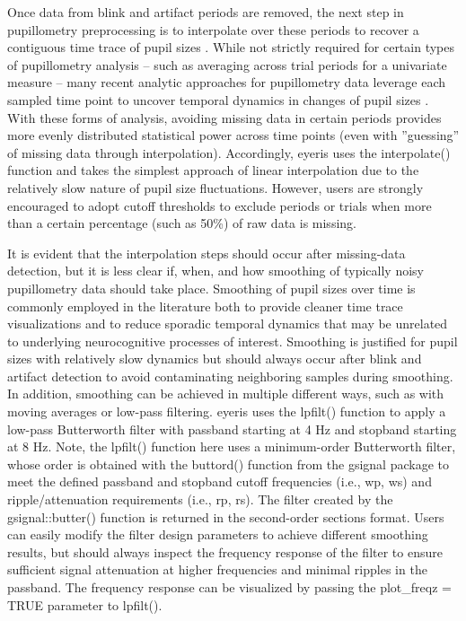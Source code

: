 Once data from blink and artifact periods are removed, the next step in pupillometry preprocessing is to interpolate over these periods to recover a contiguous time trace of pupil sizes \parencite{mathot2013simple}. While not strictly required for certain types of pupillometry analysis – such as averaging across trial periods for a univariate measure – many recent analytic approaches for pupillometry data leverage each sampled time point to uncover temporal dynamics in changes of pupil sizes \parencite{clewett2020pupil,johansson2018pupil,steinhauer2004sympathetic,urai2017pupil,vanslooten2018how,verney2004pupillary,widmann2018emotion}. With these forms of analysis, avoiding missing data in certain periods provides more evenly distributed statistical power across time points (even with ”guessing” of missing data through interpolation). Accordingly, eyeris uses the interpolate() function and takes the simplest approach of linear interpolation due to the relatively slow nature of pupil size fluctuations. However, users are strongly encouraged to adopt cutoff thresholds to exclude periods or trials when more than a certain percentage (such as 50\%) of raw data is missing.

It is evident that the interpolation steps should occur after missing-data detection, but it is less clear if, when, and how smoothing of typically noisy pupillometry data should take place. Smoothing of pupil sizes over time is commonly employed in the literature \parencite{steinhauer2022publication} both to provide cleaner time trace visualizations and to reduce sporadic temporal dynamics that may be unrelated to underlying neurocognitive processes of interest. Smoothing is justified for pupil sizes with relatively slow dynamics but should always occur after blink and artifact detection to avoid contaminating neighboring samples during smoothing. In addition, smoothing can be achieved in multiple different ways, such as with moving averages or low-pass filtering. eyeris uses the lpfilt() function to apply a low-pass Butterworth filter with passband starting at 4 Hz and stopband starting at 8 Hz. Note, the lpfilt() function here uses a minimum-order Butterworth filter, whose order is obtained with the buttord() function from the gsignal package \parencite{vanboxtel2021gsignal} to meet the defined passband and stopband cutoff frequencies (i.e., wp, ws) and ripple/attenuation requirements (i.e., rp, rs). The filter created by the gsignal::butter() function is returned in the second-order sections format. Users can easily modify the filter design parameters to achieve different smoothing results, but should always inspect the frequency response of the filter to ensure sufficient signal attenuation at higher frequencies and minimal ripples in the passband. The frequency response can be visualized by passing the plot\_freqz = TRUE parameter to lpfilt().

